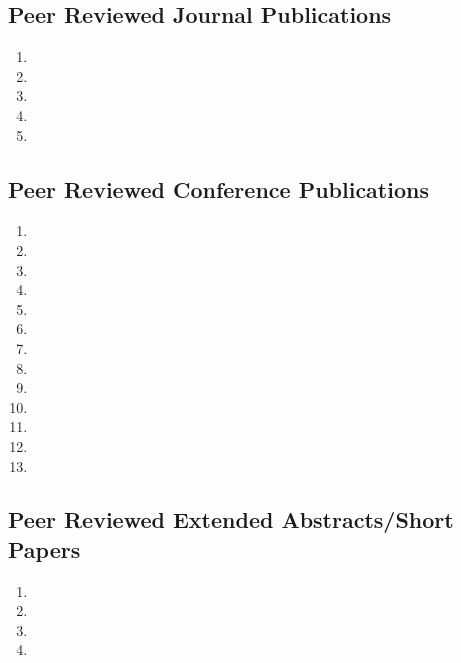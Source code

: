
\hypertarget{peer-reviewed-journal-publications}{%
\subsection{Peer Reviewed Journal
Publications}\label{peer-reviewed-journal-publications}}

\begin{enumerate}
\tightlist
\item {}
\item {}
\item {}
\item {}
\item {}
\end{enumerate}

\hypertarget{peer-reviewed-conference-publications}{%
\subsection{Peer Reviewed Conference
Publications}\label{peer-reviewed-conference-publications}}

\begin{enumerate}[resume]
\tightlist
\item {}
\item {}
\item {}
\item {}
\item {}
\item {}
\item {}
\item {}
\item {}
\item {}
\item {}
\item {}
\item {}
\end{enumerate}

\hypertarget{peer-reviewed-extended-abstractsshort-papers}{%
\subsection{Peer Reviewed Extended Abstracts/Short
Papers}\label{peer-reviewed-extended-abstractsshort-papers}}

\begin{enumerate}[resume]
\tightlist
\item {}
\item {}
\item {}
\item {}
\end{enumerate}

